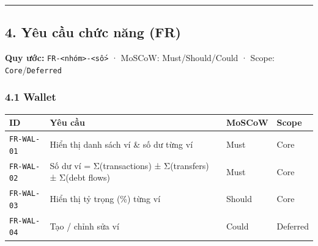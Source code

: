 \documentclass[11pt,a4paper]{article}
\newcounter{none}
\newcommand{\faintline}{%
  \noalign{\global\arrayrulecolor{faintgray}}%
  \hline
  \noalign{\global\arrayrulecolor{black}}%
} %
\begin{document}
\begin{center}\rule{1.0\linewidth}{0.5pt}\end{center}

\newpage

\subsection{4. Yêu cầu chức năng (FR)}\label{yuxeau-cux1ea7u-chux1ee9c-nux103ng-fr}

\textbf{Quy ước:}
\texttt{FR-\textless{}nhóm\textgreater{}-\textless{}số\textgreater{}} ·
MoSCoW: Must/Should/Could · Scope: \texttt{Core}/\texttt{Deferred}

\subsubsection{4.1 Wallet}\label{wallet}

{\def\LTcaptype{none}
\begin{longtable}[]{@{}
  >{\raggedright\arraybackslash}p{}
  >{\raggedright\arraybackslash}p{}
  >{\centering\arraybackslash}p{}
  >{\centering\arraybackslash}p{}@{}}
\toprule\noalign{}
\begin{minipage}[b]{\linewidth}\raggedright
ID
\end{minipage} & \begin{minipage}[b]{\linewidth}\raggedright
Yêu cầu
\end{minipage} & \begin{minipage}[b]{\linewidth}\raggedright
MoSCoW
\end{minipage} & \begin{minipage}[b]{\linewidth}\raggedright
Scope
\end{minipage} \\
\midrule\noalign{}
\endhead
\bottomrule\noalign{}
\endlastfoot
\texttt{FR-WAL-01} & Hiển thị danh sách ví \& số dư từng ví & Must & Core \\ \faintline
\texttt{FR-WAL-02} & Số dư ví = Σ(transactions) ± Σ(transfers) ± Σ(debt flows) & Must & Core \\ \faintline
\texttt{FR-WAL-03} & Hiển thị tỷ trọng (\%) từng ví & Should & Core \\ \faintline
\texttt{FR-WAL-04} & Tạo / chỉnh sửa ví & Could & Deferred \\
\end{longtable}
}
\end{document}
